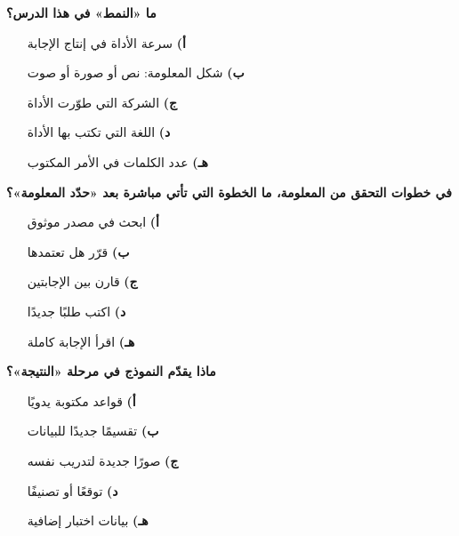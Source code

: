 \documentclass[11pt,a4paper]{article}
\begin{document}
\begin{multicols}{2}
\noindent\begin{minipage}{\linewidth}
\hangindent=0.7cm\textbf{ما «النمط» في هذا الدرس؟}
\begin{itemize}[leftmargin=0.95cm, labelsep=4pt, itemsep=0pt, topsep=2pt, parsep=0pt]
  \item[\textbf{أ)}] سرعة الأداة في إنتاج الإجابة
  \item[\textbf{ب)}] شكل المعلومة: نص أو صورة أو صوت
  \item[\textbf{ج)}] الشركة التي طوّرت الأداة
  \item[\textbf{د)}] اللغة التي تكتب بها الأداة
  \item[\textbf{هـ)}] عدد الكلمات في الأمر المكتوب
\end{itemize}
\end{minipage}\par\vspace{7pt plus 4pt}
\noindent\begin{minipage}{\linewidth}
\hangindent=0.7cm\textbf{في خطوات التحقق من المعلومة، ما الخطوة التي تأتي مباشرة بعد «حدّد المعلومة»؟}
\begin{itemize}[leftmargin=0.95cm, labelsep=4pt, itemsep=0pt, topsep=2pt, parsep=0pt]
  \item[\textbf{أ)}] ابحث في مصدر موثوق
  \item[\textbf{ب)}] قرّر هل تعتمدها
  \item[\textbf{ج)}] قارن بين الإجابتين
  \item[\textbf{د)}] اكتب طلبًا جديدًا
  \item[\textbf{هـ)}] اقرأ الإجابة كاملة
\end{itemize}
\end{minipage}\par\vspace{7pt plus 4pt}
\noindent\begin{minipage}{\linewidth}
\hangindent=0.7cm\textbf{ماذا يقدّم النموذج في مرحلة «النتيجة»؟}
\begin{itemize}[leftmargin=0.95cm, labelsep=4pt, itemsep=0pt, topsep=2pt, parsep=0pt]
  \item[\textbf{أ)}] قواعد مكتوبة يدويًا
  \item[\textbf{ب)}] تقسيمًا جديدًا للبيانات
  \item[\textbf{ج)}] صورًا جديدة لتدريب نفسه
  \item[\textbf{د)}] توقعًا أو تصنيفًا
  \item[\textbf{هـ)}] بيانات اختبار إضافية

\end{itemize}
\end{minipage}
\end{multicols}
\end{document}
